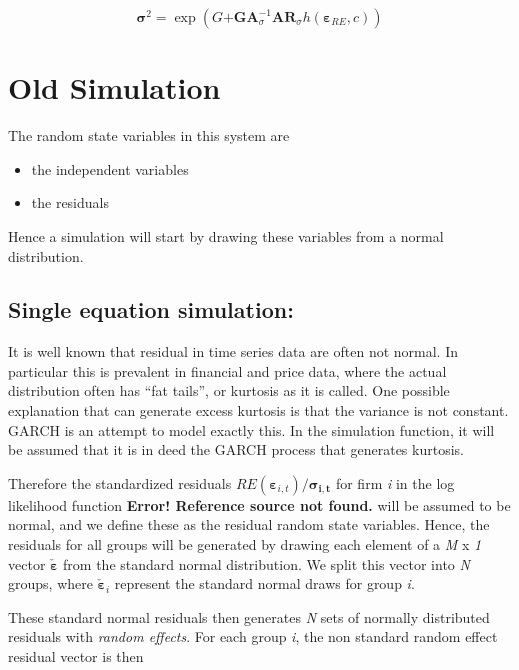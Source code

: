 \documentclass{article}
\begin{document}
  

\begin{equation}\mathbf{\sigma}^{2} = \exp\left( G\mathbf{+}\mathbf{GA}_{\sigma}^{- 1}\mathbf{AR}_{\sigma}h\left( \mathbf{\varepsilon}_{RE},c \right) \right)
\label{eq:auto_5}
\end{equation}


\section{Old Simulation}\label{old-simulation}

The random state variables in this system are

\begin{itemize}
\item
  the independent variables
\item
  the residuals
\end{itemize}

Hence a simulation will start by drawing these variables from a normal
distribution.

\subsection{Single equation
simulation:}\label{single-equation-simulation}

It is well known that residual in time series data are often not normal.
In particular this is prevalent in financial and price data, where the
actual distribution often has ``fat tails'', or kurtosis as it is
called. One possible explanation that can generate excess kurtosis is
that the variance is not constant. GARCH is an attempt to model exactly
this. In the simulation function, it will be assumed that it is in deed
the GARCH process that generates kurtosis.

Therefore the standardized residuals
$RE\left( \mathbf{\varepsilon}_{i,t} \right)/\mathbf{\sigma}_{\mathbf{i,t}}$
for firm \emph{i} in the log likelihood function \textbf{Error!
Reference source not found.} will be assumed to be normal, and we define
these as the residual random state variables. Hence, the residuals for
all groups will be generated by drawing each element of a \emph{M} x
\emph{1} vector $\check{\mathbf{\varepsilon}}$ from the standard
normal distribution. We split this vector into \emph{N} groups, where
${\check{\mathbf{\varepsilon}}}_{i}$ represent the standard normal
draws for group \emph{i}.

These standard normal residuals then generates \emph{N} sets of normally
distributed residuals with \emph{random effects}. For each group
\emph{i}, the non standard random effect residual vector is then
\end{document}
